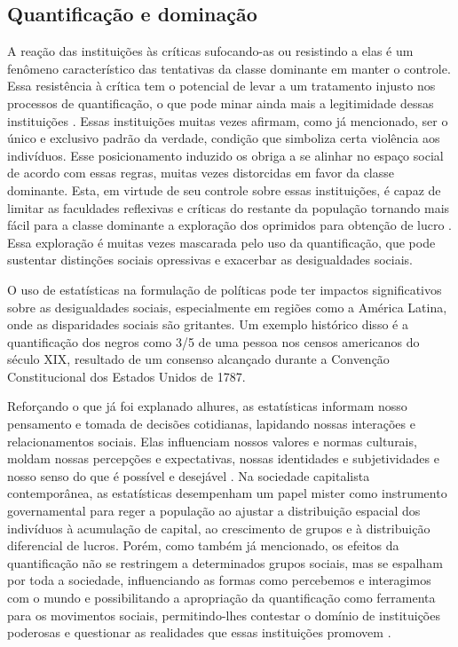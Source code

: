 \subsection{Quantificação e dominação}

A reação das instituições às críticas sufocando-as ou resistindo a elas é um fenômeno característico das tentativas da classe dominante em manter o controle. Essa resistência à crítica tem o potencial de levar a um tratamento injusto nos processos de quantificação, o que pode minar ainda mais a legitimidade dessas instituições \cite{keslassy2014isabelle}. Essas instituições muitas vezes afirmam, como já mencionado, ser o único e exclusivo padrão da verdade, condição que simboliza certa violência aos indivíduos. Esse posicionamento induzido os obriga a se alinhar no espaço social de acordo com essas regras, muitas vezes distorcidas em favor da classe dominante. Esta, em virtude de seu controle sobre essas instituições, é capaz de limitar as faculdades reflexivas e críticas do restante da população tornando mais fácil para a classe dominante a exploração dos oprimidos para obtenção de lucro \cite{starr1992social}. Essa exploração é muitas vezes mascarada pelo uso da quantificação, que pode sustentar distinções sociais opressivas e exacerbar as desigualdades sociais.

O uso de estatísticas na formulação de políticas pode ter impactos significativos sobre as desigualdades sociais, especialmente em regiões como a América Latina, onde as disparidades sociais são gritantes. Um exemplo histórico disso é a quantificação dos negros como 3/5 de uma pessoa nos censos americanos do século XIX, resultado de um consenso alcançado durante a Convenção Constitucional dos Estados Unidos de 1787.

Reforçando o que já foi explanado alhures, as estatísticas informam nosso pensamento e tomada de decisões cotidianas, lapidando nossas interações e relacionamentos sociais. Elas influenciam nossos valores e normas culturais, moldam nossas percepções e expectativas, nossas identidades e subjetividades e nosso senso do que é possível e desejável \cite{hacking1990taming}. Na sociedade capitalista contemporânea, as estatísticas desempenham um papel mister como instrumento governamental para reger a população ao ajustar a distribuição espacial dos indivíduos à acumulação de capital, ao crescimento de grupos e à distribuição diferencial de lucros. Porém, como também já mencionado, os efeitos da quantificação não se restringem a determinados grupos sociais, mas se espalham por toda a sociedade, influenciando as formas como percebemos e interagimos com o mundo e possibilitando a apropriação da quantificação como ferramenta para os movimentos sociais, permitindo-lhes contestar o domínio de instituições poderosas e questionar as realidades que essas instituições promovem \cite{camargo2021estudos}.

